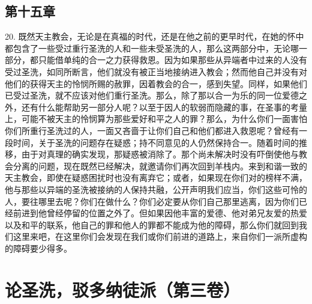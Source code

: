 
\subsection{第十五章}

20. 既然天主教会，无论是在真福的时代，还是在他之前的更早时代，在她的怀中都包含了一些受过重行圣洗的人和一些未受圣洗的人，那么这两部分中，无论哪一部分，都只能借单纯的合一之力获得救恩。因为如果那些从异端者中过来的人没有受过圣洗，如同所断言，他们就没有被正当地接纳进入教会；然而他自己并没有对他们的获得天主的怜悯所赐的赦罪，因着教会的合一，感到失望。同样，如果他们已受过圣洗，就不应该对他们重行圣洗。那么，除了那以合一为乐的同一位爱德之外，还有什么能帮助另一部分人呢？以至于因人的软弱而隐藏的事，在圣事的考量上，可能不被天主的怜悯算为那些爱好和平之人的罪？那么，为什么你们一面害怕你们所重行圣洗过的人，一面又吝啬于让你们自己和他们都进入救恩呢？曾经有一段时间，关于圣洗的问题存在疑惑；持不同意见的人仍然保持合一。随着时间的推移，由于对真理的确实发现，那疑惑被消除了。那个尚未解决时没有吓倒使他与教会分离的问题，现在既然已经解决，就邀请你们再次回到羊栈内。来到和谐一致的天主教会，即使在疑惑困扰时也没有离弃它；或者，如果现在你们对的榜样不满，他与那些以异端的圣洗被接纳的人保持共融，公开声明我们应当，你们这些可怜的人，要往哪里去呢？你们在做什么？你们必定要从你们自己那里逃离，因为你们已经前进到他曾经停留的位置之外了。但如果因他丰富的爱德、他对弟兄友爱的热爱以及和平的联系，他自己的罪和他人的罪都不能成为他的障碍，那么你们就回到我们这里来吧，在这里你们会发现在我们或你们前进的道路上，来自你们一派所虚构的障碍要少得多。\par



\section{论圣洗，驳多纳徒派（第三卷）}

\par

